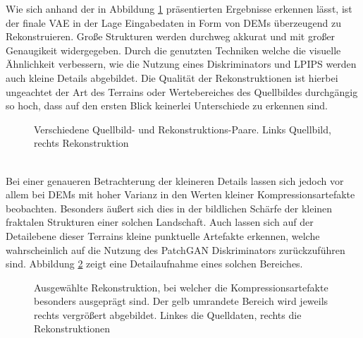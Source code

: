 Wie sich anhand der in Abbildung \ref{fig:vae_recons} präsentierten Ergebnisse erkennen lässt, ist der finale \ac{VAE} in der Lage Eingabedaten in Form von \ac{DEM}s überzeugend zu Rekonstruieren. Große Strukturen werden durchweg akkurat und mit großer Genaugikeit widergegeben. Durch die genutzten Techniken welche die visuelle Ähnlichkeit verbessern, wie die Nutzung eines Diskriminators und \ac{LPIPS} werden auch kleine Details abgebildet. Die Qualität der Rekonstruktionen ist hierbei ungeachtet der Art des Terrains oder Wertebereiches des Quellbildes durchgängig so hoch, dass auf den ersten Blick keinerlei Unterschiede zu erkennen sind. 
\begin{figure}[htbp]
    \centering

    \vspace{-8pt}

    
    \caption{Verschiedene Quellbild- und Rekonstruktions-Paare. Links Quellbild, rechts Rekonstruktion}
    \label{fig:vae_recons}
\end{figure} \\
Bei einer genaueren Betrachterung der kleineren Details lassen sich jedoch vor allem bei \ac{DEM}s mit hoher Varianz in den Werten kleiner Kompressionsartefakte beobachten. Besonders äußert sich dies in der bildlichen Schärfe der kleinen fraktalen Strukturen einer solchen Landschaft. Auch lassen sich auf der Detailebene dieser Terrains kleine punktuelle Artefakte erkennen, welche wahrscheinlich auf die Nutzung des PatchGAN Diskriminators zurückzuführen sind. Abbildung \ref{fig:vae_artefacts} zeigt eine Detailaufnahme eines solchen Bereiches.
\begin{figure}[htbp]
    \centering
    \caption{Ausgewählte Rekonstruktion, bei welcher die Kompressionsartefakte besonders ausgeprägt sind. Der gelb umrandete Bereich wird jeweils rechts vergrößert abgebildet. Linkes die Quelldaten, rechts  die Rekonstruktionen}
    \label{fig:vae_artefacts}
\end{figure} \\
